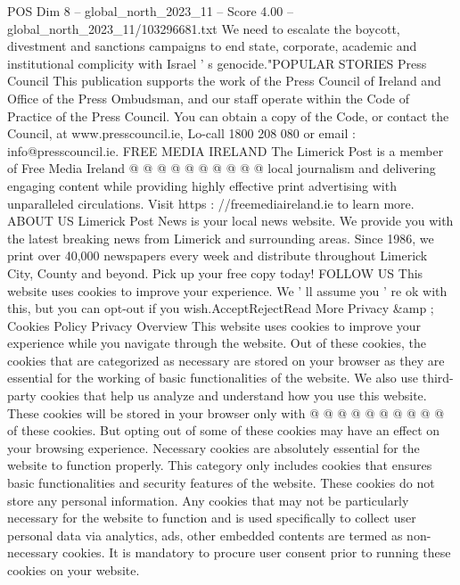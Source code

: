 \begin{textsample}{POS Dim 8 – global\_north\_2023\_11 – Score 4.00 – global\_north\_2023\_11/103296681.txt}
We need to escalate the boycott, divestment and sanctions campaigns to end state, corporate, academic and institutional complicity with Israel ' s genocide."POPULAR STORIES Press Council This publication supports the work of the Press Council of Ireland and Office of the Press Ombudsman, and our staff operate within the Code of Practice of the Press Council.
You can obtain a copy of the Code, or contact the Council, at www.presscouncil.ie, Lo-call 1800 208 080 or email : info@presscouncil.ie.
FREE MEDIA IRELAND The Limerick Post is a member of Free Media Ireland @ @ @ @ @ @ @ @ @ @ local journalism and delivering engaging content while providing highly effective print advertising with unparalleled circulations.
Visit https : //freemediaireland.ie to learn more.
ABOUT US Limerick Post News is your local news website.
We provide you with the latest breaking news from Limerick and surrounding areas.
Since 1986, we print over 40,000 newspapers every week and distribute throughout Limerick City, County and beyond.
Pick up your free copy today!
FOLLOW US This website uses cookies to improve your experience.
We ' ll assume you ' re ok with this, but you can opt-out if you wish.AcceptRejectRead More Privacy \&amp ; Cookies Policy Privacy Overview This website uses cookies to improve your experience while you navigate through the website.
Out of these cookies, the cookies that are categorized as necessary are stored on your browser as they are essential for the working of basic functionalities of the website.
We also use third-party cookies that help us analyze and understand how you use this website.
These cookies will be stored in your browser only with @ @ @ @ @ @ @ @ @ @ of these cookies.
But opting out of some of these cookies may have an effect on your browsing experience.
Necessary cookies are absolutely essential for the website to function properly.
This category only includes cookies that ensures basic functionalities and security features of the website.
These cookies do not store any personal information.
Any cookies that may not be particularly necessary for the website to function and is used specifically to collect user personal data via analytics, ads, other embedded contents are termed as non-necessary cookies.
It is mandatory to procure user consent prior to running these cookies on your website.

\end{textsample}
